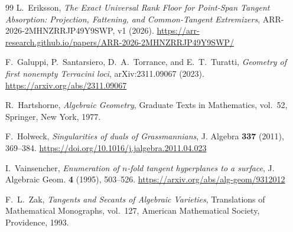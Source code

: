 \documentclass[11pt]{article}
\begin{document}
\begin{thebibliography}{99}
L.~Eriksson,
\emph{The Exact Universal Rank Floor for Point-Span Tangent Absorption:
Projection, Fattening, and Common-Tangent Extremizers},
ARR-2026-2MHNZRRJP49Y9SWP, v1 (2026).
\url{https://arr-research.github.io/papers/ARR-2026-2MHNZRRJP49Y9SWP/}

F.~Galuppi, P.~Santarsiero, D.~A.~Torrance, and E.~T.~Turatti,
\emph{Geometry of first nonempty Terracini loci},
arXiv:2311.09067 (2023).
\url{https://arxiv.org/abs/2311.09067}

R.~Hartshorne,
\emph{Algebraic Geometry},
Graduate Texts in Mathematics, vol.~52, Springer, New York, 1977.

F.~Holweck,
\emph{Singularities of duals of Grassmannians},
J. Algebra \textbf{337} (2011), 369--384.
\url{https://doi.org/10.1016/j.jalgebra.2011.04.023}

I.~Vainsencher,
\emph{Enumeration of $n$-fold tangent hyperplanes to a surface},
J. Algebraic Geom. \textbf{4} (1995), 503--526.
\url{https://arxiv.org/abs/alg-geom/9312012}

F.~L.~Zak,
\emph{Tangents and Secants of Algebraic Varieties},
Translations of Mathematical Monographs, vol.~127,
American Mathematical Society, Providence, 1993.

\end{thebibliography}
\end{document}
